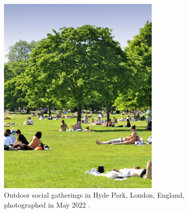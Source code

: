 \begin{figure}[h!]
\centering
\includegraphics[width=0.70\textwidth]{images/introduction/hyde2.jpeg}
\captionsetup{width=0.70\linewidth}
\caption[Hyde Park]{Outdoor social gatherings in Hyde Park, London, England, photographed in May 2022 \cite{sanderson_green_2023}.}
\label{fig:hyde_park}
\end{figure}

